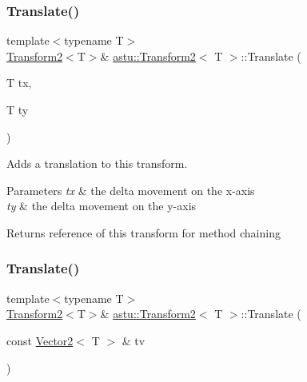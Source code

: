 \subsubsection{\texorpdfstring{Translate()}{Translate()}\hspace{0.1cm}{\footnotesize\ttfamily [1/2]}}
{\footnotesize\ttfamily template$<$typename T$>$ \\
\hyperlink{classastu_1_1Transform2}{Transform2}$<$T$>$\& \hyperlink{classastu_1_1Transform2}{astu\+::\+Transform2}$<$ T $>$\+::Translate (\begin{DoxyParamCaption}\item[{T}]{tx,  }\item[{T}]{ty }\end{DoxyParamCaption})\hspace{0.3cm}{\ttfamily [inline]}}

Adds a translation to this transform.


\begin{DoxyParams}{Parameters}
{\em tx} & the delta movement on the x-\/axis \\
\hline
{\em ty} & the delta movement on the y-\/axis \\
\hline
\end{DoxyParams}
\begin{DoxyReturn}{Returns}
reference of this transform for method chaining 
\end{DoxyReturn}
\mbox{\label{classastu_1_1Transform2_aaa0fc40153ba380690ba312b59307b03}} 
\subsubsection{\texorpdfstring{Translate()}{Translate()}\hspace{0.1cm}{\footnotesize\ttfamily [2/2]}}
{\footnotesize\ttfamily template$<$typename T$>$ \\
\hyperlink{classastu_1_1Transform2}{Transform2}$<$T$>$\& \hyperlink{classastu_1_1Transform2}{astu\+::\+Transform2}$<$ T $>$\+::Translate (\begin{DoxyParamCaption}\item[{const \hyperlink{classastu_1_1Vector2}{Vector2}$<$ T $>$ \&}]{tv }\end{DoxyParamCaption})\hspace{0.3cm}{\ttfamily [inline]}}

